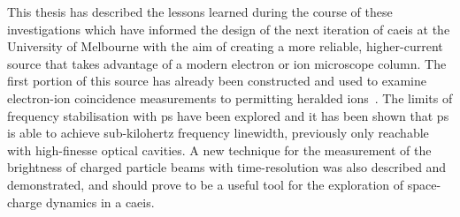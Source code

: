 This thesis has described the lessons learned during the course of these investigations which have informed the design of the next iteration of \gls{caeis} at the University of Melbourne with the aim of creating a more reliable, higher-current source that takes advantage of a modern electron or ion microscope column.
The first portion of this source has already been constructed and used to examine electron-ion coincidence measurements to permitting heralded ions~\cite{mcculloch_heralded_2018}.
The limits of frequency stabilisation with \gls{ps} have been explored and it has been shown that \gls{ps} is able to achieve sub-kilohertz frequency linewidth, previously only reachable with high-finesse optical cavities.
A new technique for the measurement of the brightness of charged particle beams with time-resolution was also described and demonstrated, and should prove to be a useful tool for the exploration of space-charge dynamics in a \gls{caeis}.
